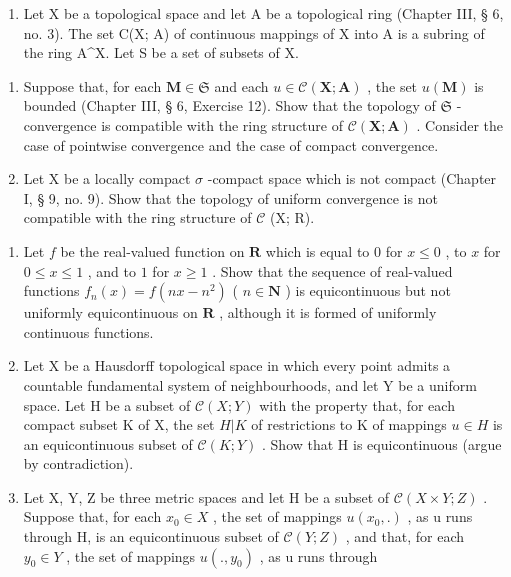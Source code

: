 \begin{enumerate}
\def\labelenumi{\arabic{enumi})}
\setcounter{enumi}{11}
\tightlist
\item
  Let X be a topological space and let A be a topological ring (Chapter III, § 6, no. 3). The set C(X; A) of continuous mappings of X into A is a subring of the ring A\^{}X. Let S be a set of subsets of X.
\end{enumerate}

\begin{enumerate}
\def\labelenumi{\alph{enumi})}
\item
  Suppose that, for each \(\mathbf{M} \in \mathfrak{S}\) and each \(u \in \mathcal{C}(\mathbf{X}; \mathbf{A})\) , the set \(u(\mathbf{M})\) is bounded (Chapter III, § 6, Exercise 12). Show that the topology of \(\mathfrak{S}\) -convergence is compatible with the ring structure of \(\mathcal{C}(\mathbf{X}; \mathbf{A})\) . Consider the case of pointwise convergence and the case of compact convergence.
\item
  Let X be a locally compact \(\sigma\) -compact space which is not compact (Chapter I, § 9, no. 9). Show that the topology of uniform convergence is not compatible with the ring structure of \(\mathcal{C}\) (X; R).
\end{enumerate}

\ExerciseSection

\begin{enumerate}
\def\labelenumi{\arabic{enumi})}
\item
  Let \(f\) be the real-valued function on \(\mathbf{R}\) which is equal to \(0\) for \(x \leqslant 0\) , to \(x\) for \(0 \leqslant x \leqslant 1\) , and to \(1\) for \(x \geqslant 1\) . Show that the sequence of real-valued functions \(f_n(x) = f(nx - n^2)\) ( \(n \in \mathbf{N}\) ) is equicontinuous but not uniformly equicontinuous on \(\mathbf{R}\) , although it is formed of uniformly continuous functions.
\item
  Let X be a Hausdorff topological space in which every point admits a countable fundamental system of neighbourhoods, and let Y be a uniform space. Let H be a subset of \(\mathcal{C}(X;Y)\) with the property that, for each compact subset K of X, the set \(H|K\) of restrictions to K of mappings \(u\in H\) is an equicontinuous subset of \(\mathcal{C}(K;Y)\) . Show that H is equicontinuous (argue by contradiction).
\item
  Let X, Y, Z be three metric spaces and let H be a subset of \(\mathcal{C}(X \times Y; Z)\) . Suppose that, for each \(x_{0} \in X\) , the set of mappings \(u(x_{0}, .)\) , as u runs through H, is an equicontinuous subset of \(\mathcal{C}(Y; Z)\) , and that, for each \(y_{0} \in Y\) , the set of mappings \(u(., y_{0})\) , as u runs through
\end{enumerate}

